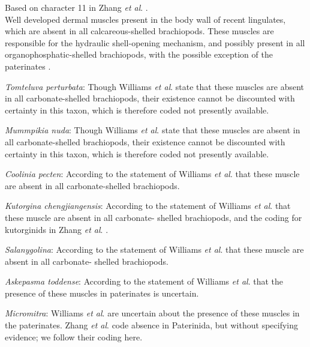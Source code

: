 \documentclass[openany]{book}
\theoremstyle{definition}
\theoremstyle{definition}
\theoremstyle{definition}
\theoremstyle{remark}
\begin{document}
Based on character 11 in Zhang \emph{et al}.
\citeyearpar{Zhang2014Anearly}.\\
Well developed dermal muscles present in the body wall of recent
lingulates, which are absent in all calcareous-shelled brachiopods.
These muscles are responsible for the hydraulic shell-opening mechanism,
and possibly present in all organophosphatic-shelled brachiopods, with
the possible exception of the paterinates
\citep[p.~32]{Williams2000BrachiopodaLinguliformea}.

\emph{Tomteluva perturbata}: Though Williams \emph{et al}.
\citeyearpar[P.32]{Williams2000BrachiopodaLinguliformea} state that
these muscles are absent in all carbonate-shelled brachiopods, their
existence cannot be discounted with certainty in this taxon, which is
therefore coded not presently available.

\emph{Mummpikia nuda}: Though Williams \emph{et al}.
\citeyearpar[P.32]{Williams2000BrachiopodaLinguliformea} state that
these muscles are absent in all carbonate-shelled brachiopods, their
existence cannot be discounted with certainty in this taxon, which is
therefore coded not presently available.

\emph{Coolinia pecten}: According to the statement of Williams \emph{et
al}. \citeyearpar[P.32]{Williams2000BrachiopodaLinguliformea} that these
muscle are absent in all carbonate-shelled brachiopods.

\emph{Kutorgina chengjiangensis}: According to the statement of Williams
\emph{et al}. \citeyearpar[P.32]{Williams2000BrachiopodaLinguliformea}
that these muscle are absent in all carbonate- shelled brachiopods, and
the coding for kutorginids in Zhang \emph{et al}.
\citeyearpar{Zhang2014Anearly}.

\emph{Salanygolina}: According to the statement of Williams \emph{et
al}. \citeyearpar[P.32]{Williams2000BrachiopodaLinguliformea} that these
muscle are absent in all carbonate- shelled brachiopods.

\emph{Askepasma toddense}: According to the statement of Williams
\emph{et al}. \citeyearpar[P.32]{Williams2000BrachiopodaLinguliformea}
that the presence of these muscles in paterinates is uncertain.

\emph{Micromitra}: Williams \emph{et al}.
\citeyearpar[P.32]{Williams2000BrachiopodaLinguliformea} are uncertain
about the presence of these muscles in the paterinates. Zhang \emph{et
al}. \citeyearpar{Zhang2014Anearly} code absence in Paterinida, but
without specifying evidence; we follow their coding here.
\end{document}
